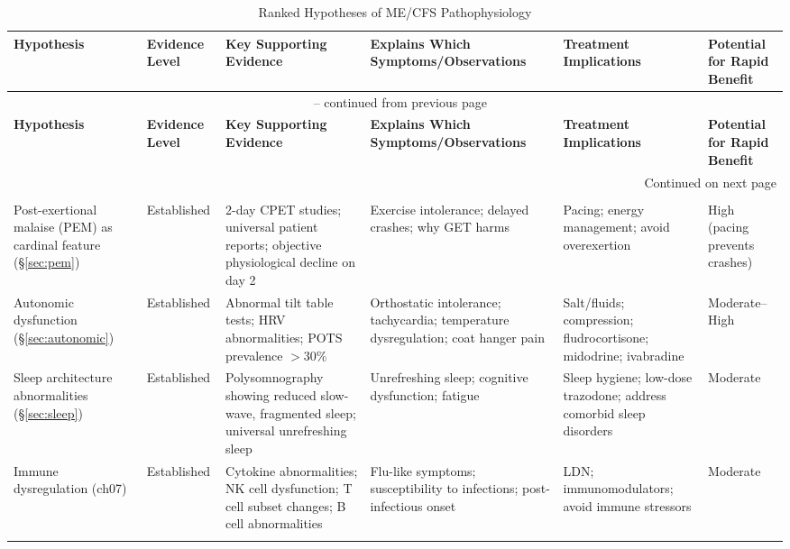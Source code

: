 \begin{landscape}
\begin{longtable}{p{2.8cm}p{1.8cm}p{4.3cm}p{4.3cm}p{3.9cm}p{2.2cm}}
\caption{Ranked Hypotheses of ME/CFS Pathophysiology} \label{tab:hypothesis-ranking} \\
\toprule
\textbf{Hypothesis} & \textbf{Evidence Level} & \textbf{Key Supporting Evidence} & \textbf{Explains Which Symptoms/Observations} & \textbf{Treatment Implications} & \textbf{Potential for Rapid Benefit} \\
\midrule
\endfirsthead
\multicolumn{6}{c}{\tablename\ \thetable{} -- continued from previous page} \\
\toprule
\textbf{Hypothesis} & \textbf{Evidence Level} & \textbf{Key Supporting Evidence} & \textbf{Explains Which Symptoms/Observations} & \textbf{Treatment Implications} & \textbf{Potential for Rapid Benefit} \\
\midrule
\endhead
\midrule \multicolumn{6}{r}{Continued on next page} \\
\endfoot
\bottomrule
\endlastfoot

\multicolumn{6}{l}{\textbf{TIER 1: ESTABLISHED PHENOMENA}} \\
\addlinespace

Post-exertional malaise (PEM) as cardinal feature (\S\ref{sec:pem}) & Established & 2-day CPET studies; universal patient reports; objective physiological decline on day 2 & Exercise intolerance; delayed crashes; why GET harms & Pacing; energy management; avoid overexertion & High (pacing prevents crashes) \\
\addlinespace

Autonomic dysfunction (\S\ref{sec:autonomic}) & Established & Abnormal tilt table tests; HRV abnormalities; POTS prevalence $>$30\% & Orthostatic intolerance; tachycardia; temperature dysregulation; coat hanger pain & Salt/fluids; compression; fludrocortisone; midodrine; ivabradine & Moderate--High \\
\addlinespace

Sleep architecture abnormalities (\S\ref{sec:sleep}) & Established & Polysomnography showing reduced slow-wave, fragmented sleep; universal unrefreshing sleep & Unrefreshing sleep; cognitive dysfunction; fatigue & Sleep hygiene; low-dose trazodone; address comorbid sleep disorders & Moderate \\
\addlinespace

Immune dysregulation (ch07) & Established & Cytokine abnormalities; NK cell dysfunction; T cell subset changes; B cell abnormalities & Flu-like symptoms; susceptibility to infections; post-infectious onset & LDN; immunomodulators; avoid immune stressors & Moderate \\
\addlinespace


\end{longtable}
\end{landscape}
